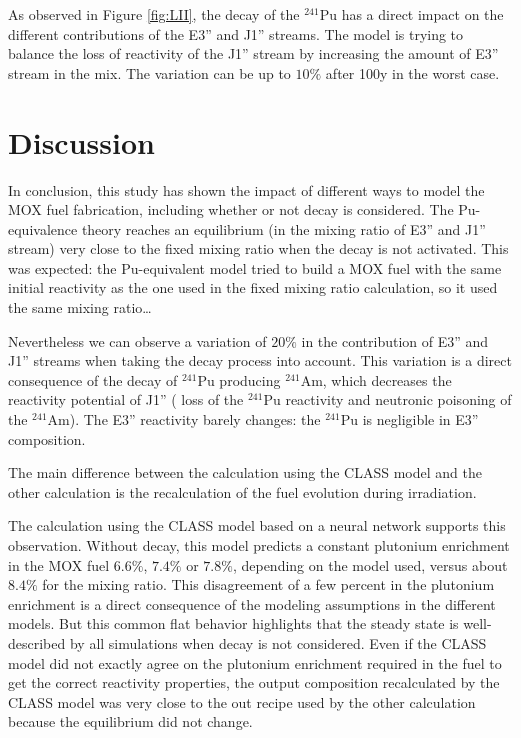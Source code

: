 \documentclass[12pt]{article}
\begin{document}
As observed in Figure \ref{fig:LII}, the decay of the $^{241}$Pu has a direct
impact on the different contributions of the E3'' and J1'' streams. The model is
trying to balance the loss of reactivity of the J1'' stream by increasing the
amount of E3'' stream in the mix. The variation can be up to $10\%$ after 100y
in the worst case.

\section{Discussion}

In conclusion, this study has shown the impact of different ways to model
the MOX fuel fabrication, including whether or not decay is considered.
The Pu-equivalence theory reaches an equilibrium (in the mixing ratio of E3'' and
J1'' stream) very close to the fixed mixing ratio when the decay is not activated.
This was expected: the Pu-equivalent model tried to build a MOX fuel with the same
initial reactivity as the one used in the fixed mixing ratio calculation, so it
used the same mixing ratio\dots  

Nevertheless we can observe a variation of $20\%$ in the contribution of E3''
and J1'' streams when taking the decay process into account. This variation is
a direct consequence of the decay of $^{241}$Pu producing $^{241}$Am, which
decreases the reactivity potential of J1'' ( loss of the $^{241}$Pu reactivity
and neutronic poisoning of the $^{241}$Am). The E3'' reactivity barely changes:
the $^{241}$Pu is negligible in E3'' composition.

The main difference between the calculation using the CLASS model and the other
calculation is the recalculation of the fuel evolution during irradiation. 

The calculation using the CLASS model based on a neural network supports this
observation. Without decay, this model predicts a constant plutonium enrichment
in the MOX fuel $6.6\%$, $7.4\%$ or $7.8\%$, depending on the model used, versus
about $8.4\%$ for the mixing ratio. This disagreement of a few percent in the
plutonium enrichment is a direct consequence of the modeling assumptions in the
different models.  But this common flat behavior highlights that the steady
state is well-described by all simulations when decay is not considered.  Even
if the CLASS model did not exactly agree on the plutonium enrichment required in
the fuel to get the correct reactivity properties, the output composition
recalculated by the CLASS model was very close to the out recipe used by the
other calculation because the equilibrium did not change.
\end{document}
